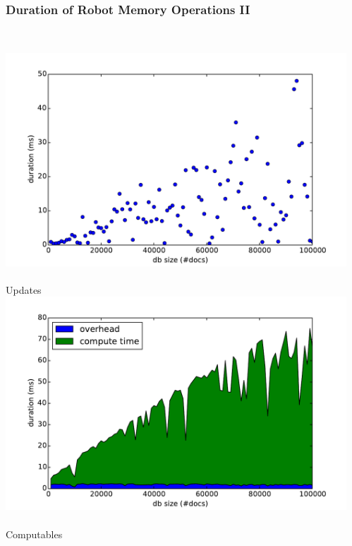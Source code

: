 \begin{frame}
  \frametitle{Duration of Robot Memory Operations II}
  \centering
  \begin{columns}
    \begin{column}{0.55\textwidth}
  \centering
    \small
    \\\vspace{-0.16cm}
    \includegraphics[width=\textwidth]{../thesis/plots/update-durations}\\
    \\\vspace{-0.08cm}
    Updates
    \\\vspace{-0.05cm}
    \includegraphics[width=\textwidth]{../thesis/plots/computable-durations}\\
    \\\vspace{-0.05cm}
    Computables
    \end{column}
    \begin{column}{0.55\textwidth}

\end{column}
\end{columns}
\end{frame}

